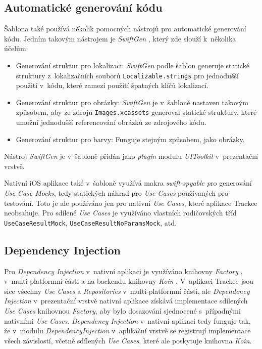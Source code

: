 \subsection{Automatické generování kódu}

Šablona také používá několik pomocných nástrojů pro automatické generování kódu. Jedním takovým nástrojem je \emph{SwiftGen} \cite{swiftgen}, který zde slouží k~několika účelům:
\begin{itemize}
\item Generování struktur pro lokalizaci: \emph{SwiftGen} podle šablon generuje statické struktury z~lokalizačních souborů \texttt{Localizable.strings} pro jednodušší použití v~kódu, které zamezí použití špatných klíčů lokalizací.
\item Generování struktur pro obrázky: \emph{SwiftGen} je v~šabloně nastaven takovým způsobem, aby ze zdrojů \texttt{Images.xcassets} generoval statické struktury, které umožní jednodušší referencování obrázků ze zdrojového kódu.
\item Generování struktur pro barvy: Funguje stejným způsobem, jako obrázky.
\end{itemize}
Nástroj \emph{SwiftGen} je v~šabloně přidán jako \emph{plugin} modulu \emph{UIToolkit} v~prezentační vrstvě.

Nativní iOS aplikace také v~šabloně využívá makra \emph{swift-spyable} \cite{swift-spyable} \emph pro generování \emph{Use Case Mocks}, tedy statických náhrad pro \emph{Use Cases} používaných pro testování. Toto je ale používáno jen pro nativní \emph{Use Cases}, které aplikace Trackee neobsahuje. Pro sdílené \emph{Use Cases} je využíváno vlastních rodičovských tříd \texttt{UseCaseResultMock}, \texttt{UseCaseResultNoParamsMock}, atd.

\subsection{Dependency Injection}

Pro \emph{Dependency Injection} v~nativní aplikaci je využíváno knihovny \emph{Factory} \cite{factory}, v~multi-platformní části a na backendu knihovny \emph{Koin} \cite{koin}. V~aplikaci Trackee jsou sice všechny \emph{Use Cases} a \emph{Repositories} v~multi-platformní části, ale \emph{Dependency Injection} v~prezentační vrstvě nativní aplikace získává implementace sdílených \emph{Use Cases} knihovnou \emph{Factory}, aby bylo dosazování sjednocené s~případnými nativními \emph{Use Cases}. \emph{Dependency Injection} v~nativní aplikaci tedy funguje tak, že v~modulu \emph{DependencyInjection} v~aplikační vrstvě se registrují implementace všech závislostí, včetně sdílených \emph{Use Cases}, které ale poskytuje knihovna \emph{Koin}.

